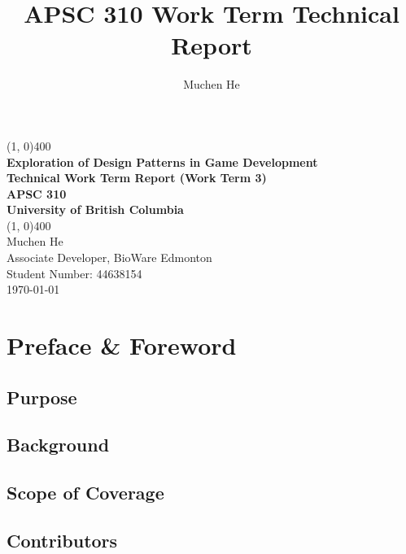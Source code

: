 \documentclass[10pt,letterpaper]{article}
\author{Muchen He}
\title{APSC 310 Work Term Technical Report}
\newcommand{\titletext}{Exploration of Design Patterns in Game Development}
\begin{document}
\begin{titlepage}
	\begin{center}
		\vspace*{3in}
		\line(1, 0){400}\\
		\Huge{\textbf{\titletext{}}}\\[0.2cm]
		\large{\textbf{Technical Work Term Report (Work Term 3)}}\\[1cm]
		\Large{\textbf{APSC 310}}\\
		\textbf{University of British Columbia}\\
		\line(1, 0){400}\\
		\vfill
		\Large{Muchen He}\\
		\large{Associate Developer, BioWare Edmonton}\\
		Student Number: 44638154\\

		\today \\
	\end{center}
\end{titlepage}

\setcounter{secnumdepth}{3}
\tableofcontents
\thispagestyle{empty}
\clearpage



\section*{Preface \& Foreword}

\subsection*{Purpose}

\subsection*{Background}

\subsection*{Scope of Coverage}

\subsection*{Contributors}
\newpage
\end{document}
